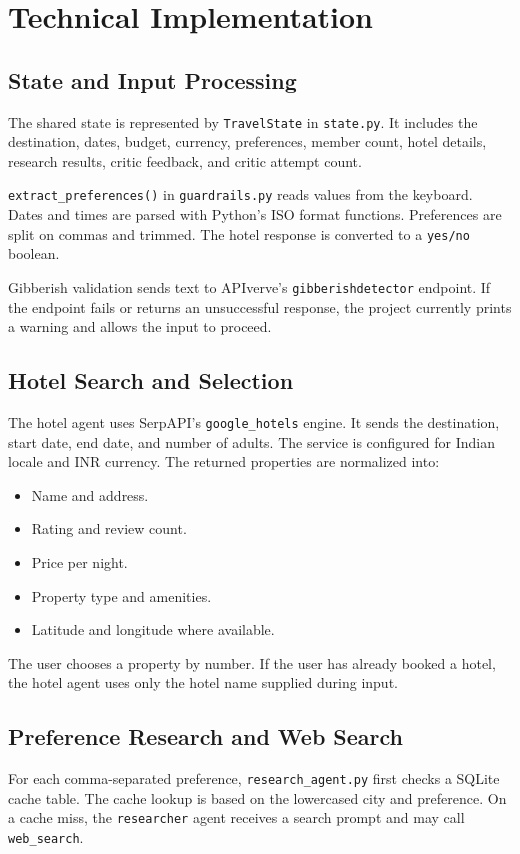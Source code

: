 \documentclass[12pt,a4paper]{report}
\begin{document}
\section{Technical Implementation}
\label{sec:technical-implementation}

\subsection{State and Input Processing}
\label{subsec:state-input}
The shared state is represented by \texttt{TravelState} in \texttt{state.py}. It includes the
destination, dates, budget, currency, preferences, member count, hotel details, research results,
critic feedback, and critic attempt count.

\texttt{extract\_preferences()} in \texttt{guardrails.py} reads values from the keyboard. Dates and
times are parsed with Python's ISO format functions. Preferences are split on commas and trimmed.
The hotel response is converted to a \texttt{yes/no} boolean.

Gibberish validation sends text to APIverve's \texttt{gibberishdetector} endpoint. If the endpoint
fails or returns an unsuccessful response, the project currently prints a warning and allows the
input to proceed.

\subsection{Hotel Search and Selection}
\label{subsec:hotel-search}
The hotel agent uses SerpAPI's \texttt{google\_hotels} engine. It sends the destination, start date,
end date, and number of adults. The service is configured for Indian locale and INR currency.
The returned properties are normalized into:
\begin{itemize}
    \item Name and address.
    \item Rating and review count.
    \item Price per night.
    \item Property type and amenities.
    \item Latitude and longitude where available.
\end{itemize}

The user chooses a property by number. If the user has already booked a hotel, the hotel agent
uses only the hotel name supplied during input.

\subsection{Preference Research and Web Search}
\label{subsec:preference-research}
For each comma-separated preference, \texttt{research\_agent.py} first checks a SQLite cache table.
The cache lookup is based on the lowercased city and preference. On a cache miss, the
\texttt{researcher} agent receives a search prompt and may call \texttt{web\_search}.
\end{document}
